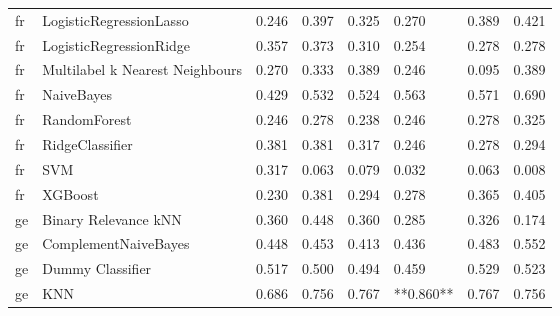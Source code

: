 \begin{tabular}{llllllll}
      fr &         LogisticRegressionLasso & 0.246 &                     0.397 &                 0.325 &                  0.270 &                                   0.389 &     0.421 \\
      fr &         LogisticRegressionRidge & 0.357 &                     0.373 &                 0.310 &                  0.254 &                                   0.278 &     0.278 \\
      fr & Multilabel k Nearest Neighbours & 0.270 &                     0.333 &                 0.389 &                  0.246 &                                   0.095 &     0.389 \\
      fr &                      NaiveBayes & 0.429 &                     0.532 &                 0.524 &                  0.563 &                                   0.571 &     0.690 \\
      fr &                    RandomForest & 0.246 &                     0.278 &                 0.238 &                  0.246 &                                   0.278 &     0.325 \\
      fr &                 RidgeClassifier & 0.381 &                     0.381 &                 0.317 &                  0.246 &                                   0.278 &     0.294 \\
      fr &                             SVM & 0.317 &                     0.063 &                 0.079 &                  0.032 &                                   0.063 &     0.008 \\
      fr &                         XGBoost & 0.230 &                     0.381 &                 0.294 &                  0.278 &                                   0.365 &     0.405 \\
      ge &            Binary Relevance kNN & 0.360 &                     0.448 &                 0.360 &                  0.285 &                                   0.326 &     0.174 \\
      ge &            ComplementNaiveBayes & 0.448 &                     0.453 &                 0.413 &                  0.436 &                                   0.483 &     0.552 \\
      ge &                Dummy Classifier & 0.517 &                     0.500 &                 0.494 &                  0.459 &                                   0.529 &     0.523 \\
      ge &                             KNN & 0.686 &                     0.756 &                 0.767 &              **0.860** &                                   0.767 &     0.756 \\

\end{tabular}
